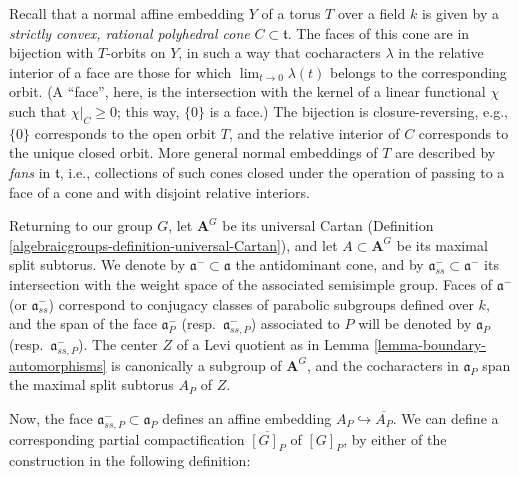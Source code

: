 Recall that a normal affine embedding $Y$ of a torus $T$ over a field $k$ is given by a \emph{strictly convex, rational polyhedral cone} $C\subset \mathfrak t$. The faces of this cone are in bijection with $T$-orbits on $Y$, in such a way that cocharacters $\lambda$ in the relative interior of a face are those for which $\lim_{t\to 0} \lambda(t)$ belongs to the corresponding orbit. (A ``face'', here, is the intersection with the kernel of a linear functional $\chi$ such that $\chi|_C \ge 0$; this way, $\{0\}$ is a face.) The bijection is closure-reversing, e.g., $\{0\}$ corresponds to the open orbit $T$, and the relative interior of $C$ corresponds to the unique closed orbit. More general normal embeddings of $T$ are described by \emph{fans} in $\mathfrak t$, i.e., collections of such cones closed under the operation of passing to a face of a cone and with disjoint relative interiors. 

Returning to our group $G$, let $\mathbf A^G$ be its universal Cartan (Definition \ref{algebraicgroups-definition-universal-Cartan}), and let $A\subset \mathbf A^G$ be its maximal split subtorus. 
We denote by $\mathfrak a^-\subset \mathfrak a$ the antidominant cone, and by $\mathfrak a^-_{ss}\subset \mathfrak a^-$ its intersection with the weight space of the associated semisimple group. Faces of $\mathfrak a^-$ (or $\mathfrak a^-_{ss}$) correspond to conjugacy classes of parabolic subgroups defined over $k$, and the span of the face $\mathfrak a_P^-$ (resp.\ $\mathfrak a_{ss,P}^-$) associated to $P$ will be denoted by $\mathfrak a_P$ (resp.\ $\mathfrak a_{ss,P}^-$). The center $Z$ of a Levi quotient as in Lemma \ref{lemma-boundary-automorphisms} is canonically a subgroup of $\mathbf A^G$, and the cocharacters in $\mathfrak a_P$ span the maximal split subtorus $A_P$ of $Z$.

Now, the face $\mathfrak a_{ss,P}^-\subset \mathfrak a_P$ defines an affine embedding $A_P \hookrightarrow \overline{A_P}$. We can define a corresponding partial compactification $\overline{[G]_P}$ of $[G]_P$, by either of the construction in the following definition:

